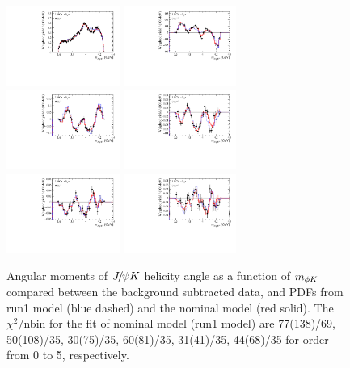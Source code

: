 \begin{figure}[!htbp]
\centering
\includegraphics[width=0.33\textwidth]{Figures/03_Zcs/app_moments/shy1z0}%
\includegraphics[width=0.33\textwidth]{Figures/03_Zcs/app_moments/shy1z1}%
\includegraphics[width=0.33\textwidth]{Figures/03_Zcs/app_moments/shy1z2}
\includegraphics[width=0.33\textwidth]{Figures/03_Zcs/app_moments/shy1z3}%
\includegraphics[width=0.33\textwidth]{Figures/03_Zcs/app_moments/shy1z4}%
\includegraphics[width=0.33\textwidth]{Figures/03_Zcs/app_moments/shy1z5}
\caption{Angular moments of ${{J\mskip -3mu/\mskip -2mu\psi}} K$ helicity angle as a function of $m_{\phi K}$ compared between the background subtracted data, and PDFs from run1 model (blue dashed) and the nominal model (red solid). The $\chi^2/$nbin for the fit of nominal model (run1 model) are 77(138)/69, 50(108)/35, 30(75)/35, 60(81)/35, 31(41)/35, 44(68)/35 for order from 0 to 5, respectively.}
\label{mom5z}
\end{figure}



